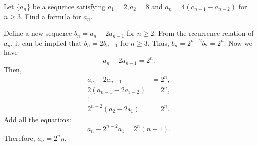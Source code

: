 \documentclass[../main.tex]{subfiles}
\begin{document}
\begin{exercise}
    Let $\{a_n\}$ be a sequence satisfying $a_1 = 2, a_2 = 8$ and $a_n = 4(a_{n-1} - a_{n-2})$ for $n \geq 3$.
    Find a formula for $a_n$.
\end{exercise}
\begin{sol}
    Define a new sequence $b_n = a_n - 2a_{n-1}$ for $n \geq 2$.
    From the recurrence relation of $a_n$, it can be implied that $b_n = 2b_{n-1}$ for $n \geq 3$.
    Thus, $b_n = 2^{n-2} b_2 = 2^n$.
    Now we have
    \[
        a_n - 2a_{n-1} = 2^n.
    \]
    Then,
    \begin{align*}
        a_n - 2a_{n-1} &= 2^n,\\
        2(a_{n-1} - 2a_{n-2}) &= 2^n,\\
        \vdots\\
        2^{n-2} (a_2 - 2a_1) &= 2^n.
    \end{align*}
    Add all the equations:
    \[
        a_n - 2^{n-2} a_1 = 2^n (n - 1).
    \]
    Therefore, $a_n = 2^n n$.
\end{sol}
\end{document}
